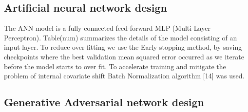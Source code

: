 \documentclass[draft, a4, 10pt, onecolumn]{IEEEtran}
\begin{document}
\subsection{Artificial neural network design}
\label{ssec:ann}
The ANN model is a fully-connected feed-forward MLP (Multi Layer Perceptron). Table(num) summarizes the details of the model consisting of an input layer. To reduce over fitting we use the Early stopping method, by saving checkpoints where the best validation mean squared error occurred as we iterate before the model starts to over fit. To accelerate training and mitigate the problem of internal covariate shift Batch Normalization algorithm [14] was used.

\begin{table}[h]
\centering
{}
\caption{Detailes of the ANN model}
\end{table}

\subsection{Generative Adversarial network design}
\label{ssec:gan}
\end{document}
